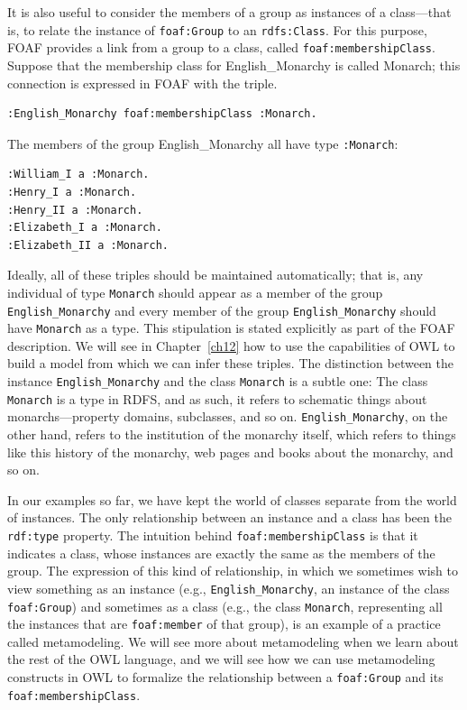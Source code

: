 It is also useful to consider the members of a group as instances of a
class---that is, to relate the instance of \texttt{foaf:Group} to an \texttt{rdfs:Class}.
For this purpose, FOAF provides a link from a group to a class, called
\texttt{foaf:membershipClass}. Suppose that the membership class for
English\_Monarchy is called Monarch; this connection is expressed in
FOAF with the triple.

\begin{lstlisting}
:English_Monarchy foaf:membershipClass :Monarch.
\end{lstlisting}

The members of the group English\_Monarchy all have type \texttt{:Monarch}:

\begin{lstlisting}
:William_I a :Monarch.
:Henry_I a :Monarch.
:Henry_II a :Monarch.
:Elizabeth_I a :Monarch.
:Elizabeth_II a :Monarch.
\end{lstlisting}

Ideally, all of these triples should be maintained automatically; that
is, any individual of type \texttt{Monarch} should appear as a member of the
group \texttt{English\_Monarchy} and every member of the group \texttt{English\_Monarchy}
should have \texttt{Monarch} as a type. This stipulation is stated explicitly as
part of the FOAF description. We will see in Chapter~\ref{ch12} how to use the
capabilities of OWL to build a model from which we can infer these
triples. The distinction between the instance \texttt{English\_Monarchy} and the
class \texttt{Monarch} is a subtle one: The class \texttt{Monarch} is a type in RDFS, and
as such, it refers to schematic things about monarchs---property
domains, subclasses, and so on. \texttt{English\_Monarchy}, on the other hand,
refers to the institution of the monarchy itself, which refers to things
like this history of the monarchy, web pages and books about the
monarchy, and so on.

In our examples so far, we have kept the world of classes separate from
the world of instances. The only relationship between an instance and a
class has been the \texttt{rdf:type} property. The intuition behind
\texttt{foaf:membershipClass} is that it indicates a class, whose instances are
exactly the same as the members of the group. The expression of this
kind of relationship, in which we sometimes wish to view something as an
instance (e.g., \texttt{English\_Monarchy}, an instance of the class \texttt{foaf:Group})
and sometimes as a class (e.g., the class \texttt{Monarch}, representing all the
instances that are \texttt{foaf:member} of that group), is an example of a
practice called metamodeling. We will see more about metamodeling when
we learn about the rest of the OWL language, and we will see how we can
use metamodeling constructs in OWL to formalize the relationship between
a \texttt{foaf:Group} and its \texttt{foaf:membershipClass}.


